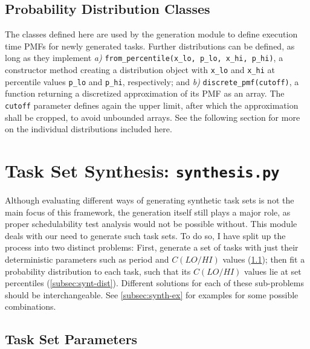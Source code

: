 \documentclass[a4paper,oneside]{csthesis}
\begin{document}
\subsection{Probability Distribution Classes}
\label{subsec:prob-dist-cls}
The classes defined here are used by the generation module to define execution time PMFs for newly generated tasks. Further distributions can be defined, as long as they implement \textit{a)} \texttt{from\_percentile(x\_lo, p\_lo, x\_hi, p\_hi)}, a constructor method creating a distribution object with \texttt{x\_lo} and \texttt{x\_hi} at percentile values \texttt{p\_lo} and \texttt{p\_hi}, respectively; and \textit{b)} \texttt{discrete\_pmf(cutoff)}, a function returning a discretized approximation of its PMF as an array. The \texttt{cutoff} parameter defines again the upper limit, after which the approximation shall be cropped, to avoid unbounded arrays. See the following section for more on the individual distributions included here.

\section{Task Set Synthesis: \texttt{synthesis.py}}
Although evaluating different ways of generating synthetic task sets is not the main focus of this framework, the generation itself still plays a major role, as proper schedulability test analysis would not be possible without. This module deals with our need to generate such task sets. To do so, I have split up the process into two distinct problems: First, generate a set of tasks with just their deterministic parameters such as period and $C(LO/HI)$ values (\cref{subsec:synth-param}); then fit a probability distribution to each task, such that its $C(LO/HI)$ values lie at set percentiles (\cref{subsec:synt-dist}). Different solutions for each of these sub-problems should be interchangeable. See \cref{subsec:synth-ex} for examples for some possible combinations.

\subsection{Task Set Parameters}
\label{subsec:synth-param}
\end{document}
